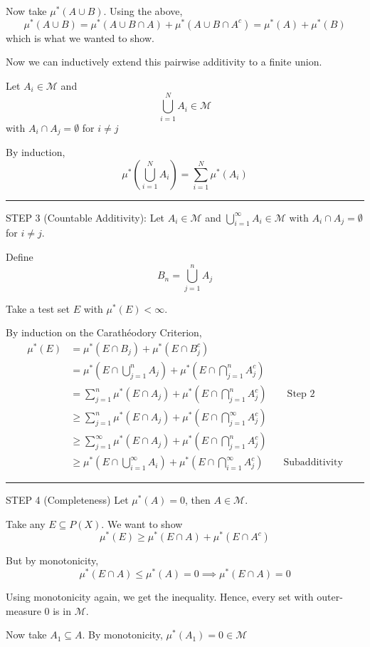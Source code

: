 \documentclass[12pt]{report}
\newcommand{\M}{\mathcal{M}}
\newcommand{\sub}{\subseteq}
\renewcommand{\div}{\vspace*{10pt}\hrule\vspace*{10pt}}
\newenvironment*{tbox}[2][gray]{
    \begin{tcolorbox}[
        parbox=false,
        colback=#1!5!white,
        colframe=#1!75!black,
        breakable,
        title={#2}
    ]}
    {\end{tcolorbox}}
\begin{document}
\begin{tbox}{\textbf{Carathéodory Procedure:} If $\mu^*$ is an outer measure and $\M$ are $\mu^*$-measurable sets, then $\M$ is a $\sigma$-algebra and $\mu^*\big\vert_{\M}$ is a measure on $\M$}
        Now take $\mu^*(A \cup B)$. Using the above, 
        \[\mu^*(A \cup B) = \mu^*(A \cup B \cap A) + \mu^*(A \cup B \cap A^c) = \mu^*(A) + \mu^*(B)\]
        which is what we wanted to show. 

        Now we can inductively extend this pairwise additivity to a finite union.

        Let $A_i \in \M$ and 
        \[\bigcup_{i=1}^N A_i \in \M\]
        with $A_i \cap A_j = \emptyset$ for $i \neq j$

        By induction, 
        \[\mu^*\left(\bigcup_{i=1}^N A_i\right) = \sum_{i=1}^{N} \mu^*(A_i)\]
        
        \div 

        STEP 3 (Countable Additivity): Let $A_i \in \M$ and $\bigcup_{i=1}^\infty A_i \in \M$ with $A_i \cap A_j = \emptyset$ for $i \neq j$.

        Define 
        \[B_n = \bigcup_{j=1}^n A_j\]

        Take a test set $E$ with $\mu^*(E) < \infty$. 

        By induction on the Carathéodory Criterion,
        \begin{align*}
            \mu^*(E) &= \mu^*(E \cap B_j) + \mu^*(E \cap B_j^c)\\ 
                &= \mu^*\left(E \cap \bigcup_{j=1}^n A_j\right) + \mu^*\left(E \cap \bigcap_{j=1}^n A_j^c\right)\\ 
                &= \sum_{j=1}^{n} \mu^*(E \cap A_j) + \mu^*(E \cap \bigcap_{j=1}^n A_j^c) \qquad \text{Step 2}\\ 
                &\geq \sum_{j=1}^{n} \mu^*(E \cap A_j) + \mu^*(E \cap \bigcap_{j=1}^{\infty} A_j^c)\\ 
                &\geq \sum_{j=1}^{\infty} \mu^*(E \cap A_j) + \mu^*(E \cap \bigcap_{j=1}^n A_j^c)\\ 
                &\geq \mu^*\left(E \cap \bigcup_{i=1}^\infty  A_i\right) + \mu^*\left(E \cap \bigcap_{i=1}^{\infty} A_j^c\right) \qquad \text{Subadditivity}
        \end{align*}

        \div

        STEP 4 (Completeness) Let $\mu^*(A) = 0$, then $A \in \M$. 

        Take any $E \sub P(X)$. We want to show 
        \[\mu^*(E) \geq \mu^*(E \cap A) + \mu^*(E \cap A^c)\]

        But by monotonicity, 
        \[\mu^*(E \cap A) \leq \mu^*(A) = 0 \implies \mu^*(E \cap A) = 0\]

        Using monotonicity again, we get the inequality. Hence, every set with outer-measure $0$ is in $\M$.  

        Now take $A_1 \sub A$. By monotonicity, $\mu^*(A_1) = 0 \in \M$    
    \end{tbox}
\end{document}
